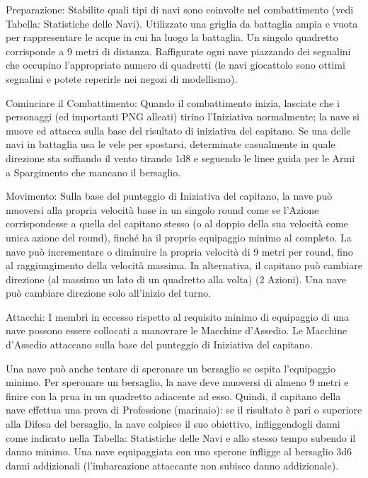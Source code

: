 \documentclass[a4paper,11pt,twoside,openany]{book}
\begin{document}
	{Preparazione:} Stabilite quali tipi di navi sono coinvolte nel combattimento (vedi Tabella: Statistiche delle Navi). Utilizzate una griglia da battaglia ampia e vuota per rappresentare le acque in cui ha luogo la battaglia. Un singolo quadretto corrisponde a 9 metri di distanza. Raffigurate ogni nave piazzando dei segnalini che occupino l'appropriato numero di quadretti (le navi giocattolo sono ottimi segnalini e potete reperirle nei negozi di modellismo).{}

	{Cominciare il Combattimento:} Quando il combattimento inizia, lasciate che i personaggi (ed importanti PNG alleati) tirino l'Iniziativa normalmente; la nave si muove ed attacca sulla base del risultato di iniziativa del capitano. Se una delle navi in battaglia usa le vele per spostarsi, determinate casualmente in quale direzione sta soffiando il vento tirando 1d8 e seguendo le linee guida per le Armi a Spargimento che mancano il bersaglio.{}

	{Movimento:} Sulla base del punteggio di Iniziativa del capitano, la nave può muoversi alla propria velocità base in un singolo round come se l'Azione corrispondesse a quella del capitano stesso (o al doppio della sua velocità come unica azione del round), finché ha il proprio equipaggio minimo al completo. La nave può incrementare o diminuire la propria velocità di 9 metri per round, fino al raggiungimento della velocità massima. In alternativa, il capitano può cambiare direzione (al massimo un lato di un quadretto alla volta) (2 Azioni). Una nave può cambiare direzione solo all'inizio del turno.{}

	{Attacchi:} I membri in eccesso rispetto al requisito minimo di equipaggio di una nave possono essere collocati a manovrare le Macchine d'Assedio. Le Macchine d'Assedio attaccano sulla base del punteggio di Iniziativa del capitano.{}

Una nave può anche tentare di speronare un bersaglio se ospita l'equipaggio minimo. Per speronare un bersaglio, la nave deve muoversi di almeno 9 metri e finire con la prua in un quadretto adiacente ad esso.
Quindi, il capitano della nave effettua una prova di Professione (marinaio): se il risultato è pari o superiore alla Difesa del bersaglio, la nave colpisce il suo obiettivo, infliggendogli danni come indicato nella Tabella: Statistiche delle Navi e allo stesso tempo subendo il danno minimo. Una nave equipaggiata con uno sperone infligge al bersaglio 3d6 danni addizionali (l'imbarcazione attaccante non subisce danno addizionale).
\end{document}
